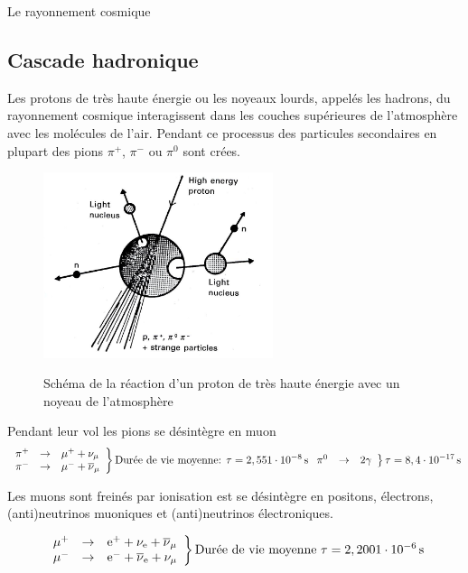 \documentclass[a4paper,11pt,liststotocnumbered,bibtotocnumbered]{scrartcl}
\begin{document}
\begin{section}{Le rayonnement cosmique}
  \subsection{Cascade hadronique}
   Les protons de très haute énergie ou les noyeaux lourds, appelés les hadrons, du rayonnement cosmique interagissent dans les couches supérieures de l'atmosphère avec les molécules de l'air. Pendant ce processus des particules secondaires en plupart des pions $\pi^+$, $\pi^-$ ou $\pi^0$ sont crées. 
   \begin{figure}[htb]
    \center
    \includegraphics[width=0.6\textwidth]{bilder/03.jpg}
    \caption{Schéma de la réaction d'un proton de très haute énergie avec un noyeau de l'atmosphère}
    \cite[S.~133]{longair}
    \label{fig:preaktion}
   \end{figure}

   Pendant leur vol les pions se désintègre en muon
   \begin{equation*}
    \left.
    \begin{array}[]{lll}
     \pi^{+} & \rightarrow & \mu^{+} + \nu_{\mu}\\
     \pi^{-} & \rightarrow & \mu^{-} + \overline{\nu}_{\mu}\\	
    \end{array}
    \right\} \idx{Durée de vie moyenne: } \tau=\unit[2,551\cdot10^{-8}]{s}
    \left.
    \begin{array}[]{lll}
     \pi^{0} & \rightarrow & 2\gamma	
    \end{array}
    \right\} \tau=\unit[8,4\cdot10^{-17}]{s}
   \end{equation*}

   Les muons sont freinés par ionisation est se désintègre en positons, électrons, (anti)neutrinos muoniques et (anti)neutrinos électroniques. 

   \begin{equation*}
    \left.
    \begin{array}[]{lll}
     \mu^{+} & \rightarrow & \text{e}^{+} + \nu_{\text{e}} + \overline{\nu}_{\mu}\\
     \mu^{-} & \rightarrow & \text{e}^{-} + \overline{\nu}_{\text{e}} + \nu_{\mu}
    \end{array}
    \right\} \text{Durée de vie moyenne } \tau=\unit[2,2001\cdot10^{-6}]{s}
   \end{equation*}


\end{section}
\end{document}
